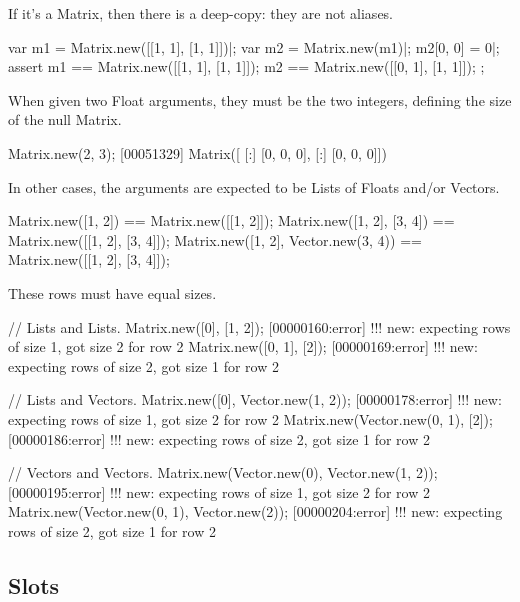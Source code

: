 If it's a Matrix, then there is a deep-copy: they are not aliases.

\begin{urbiscript}
var m1 = Matrix.new([[1, 1], [1, 1]])|;
var m2 = Matrix.new(m1)|;
m2[0, 0] = 0|;
assert
{
  m1 == Matrix.new([[1, 1], [1, 1]]);
  m2 == Matrix.new([[0, 1], [1, 1]]);
};
\end{urbiscript}

When given two Float arguments, they must be the two integers, defining the
size of the null Matrix.
\begin{urbiscript}
Matrix.new(2, 3);
[00051329] Matrix([
[:]  [0, 0, 0],
[:]  [0, 0, 0]])
\end{urbiscript}

In other cases, the arguments are expected to be Lists of Floats and/or
Vectors.

\begin{urbiassert}
Matrix.new([1, 2])                   == Matrix.new([[1, 2]]);
Matrix.new([1, 2],           [3, 4]) == Matrix.new([[1, 2], [3, 4]]);
Matrix.new([1, 2], Vector.new(3, 4)) == Matrix.new([[1, 2], [3, 4]]);
\end{urbiassert}

These rows must have equal sizes.

\begin{urbiscript}
// Lists and Lists.
Matrix.new([0], [1, 2]);
[00000160:error] !!! new: expecting rows of size 1, got size 2 for row 2
Matrix.new([0, 1], [2]);
[00000169:error] !!! new: expecting rows of size 2, got size 1 for row 2

// Lists and Vectors.
Matrix.new([0], Vector.new(1, 2));
[00000178:error] !!! new: expecting rows of size 1, got size 2 for row 2
Matrix.new(Vector.new(0, 1), [2]);
[00000186:error] !!! new: expecting rows of size 2, got size 1 for row 2

// Vectors and Vectors.
Matrix.new(Vector.new(0), Vector.new(1, 2));
[00000195:error] !!! new: expecting rows of size 1, got size 2 for row 2
Matrix.new(Vector.new(0, 1), Vector.new(2));
[00000204:error] !!! new: expecting rows of size 2, got size 1 for row 2
\end{urbiscript}


\subsection{Slots}

